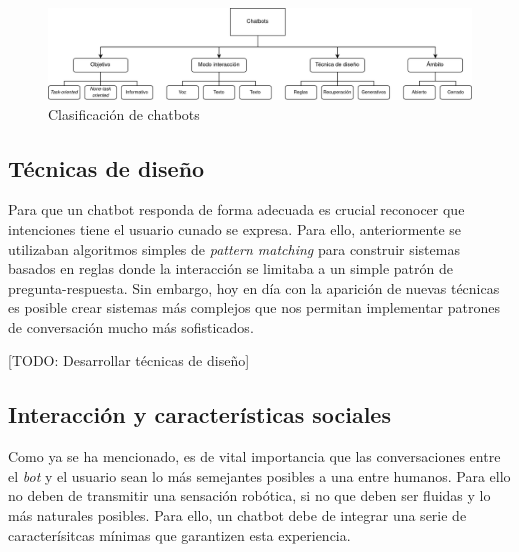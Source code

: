 \begin{figure}[htbp]
\centering
\includegraphics[scale=0.25]{../images/clasificacionChatbots.png} 
\caption{Clasificación de chatbots}
\label{fig:x clasificacion chatbots}
\end{figure}

 
 
\subsection{Técnicas de diseño }
\label{tecnicas diseño}
Para que un chatbot responda de forma adecuada es crucial reconocer que intenciones tiene el usuario cunado se expresa. Para ello, anteriormente se utilizaban algoritmos simples de \textit{pattern matching} para construir sistemas basados en reglas donde la interacción se limitaba a un simple patrón de pregunta-respuesta. Sin embargo, hoy en día con la aparición de nuevas técnicas es posible crear sistemas más complejos que nos permitan implementar patrones de conversación mucho más sofisticados.%


[TODO: Desarrollar técnicas de diseño]


\subsection{Interacción y características sociales}
\label{interaccion}
Como ya se ha mencionado, es de vital importancia que las conversaciones entre el \textit{bot} y el usuario sean lo más semejantes posibles a una entre humanos. Para ello no deben de transmitir una sensación robótica, si no que deben ser fluidas y lo más naturales posibles. Para ello, un chatbot debe de integrar una serie de caracterísitcas mínimas que garantizen esta experiencia.\\

